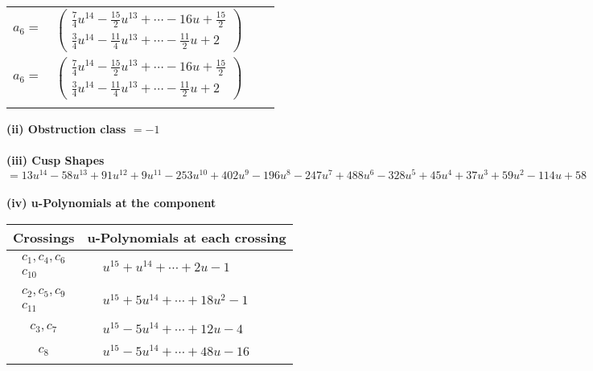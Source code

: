 \documentclass[1p]{elsarticle_modified}
\theoremstyle{definition}
\begin{document}
\begin{tabular}{m{7pt} m{180pt} m{7pt} m{180pt} }
\flushright $a_{6}=$&$\begin{pmatrix}\frac{7}{4} u^{14}-\frac{15}{2} u^{13}+\cdots-16 u+\frac{15}{2}\\\frac{3}{4} u^{14}-\frac{11}{4} u^{13}+\cdots-\frac{11}{2} u+2\end{pmatrix}$\\ \flushright $a_{6}=$&$\begin{pmatrix}\frac{7}{4} u^{14}-\frac{15}{2} u^{13}+\cdots-16 u+\frac{15}{2}\\\frac{3}{4} u^{14}-\frac{11}{4} u^{13}+\cdots-\frac{11}{2} u+2\end{pmatrix}$\\&\end{tabular}
\flushleft \textbf{(ii) Obstruction class $= -1$}\\~\\
\flushleft \textbf{(iii) Cusp Shapes $= 13 u^{14}-58 u^{13}+91 u^{12}+9 u^{11}-253 u^{10}+402 u^9-196 u^8-247 u^7+488 u^6-328 u^5+45 u^4+37 u^3+59 u^2-114 u+58$}\\~\\
\newpage\renewcommand{\arraystretch}{1}
\flushleft \textbf{(iv) u-Polynomials at the component}\newline \\
\begin{tabular}{m{50pt}|m{274pt}}
Crossings & \hspace{64pt}u-Polynomials at each crossing \\
\hline $$\begin{aligned}c_{1},c_{4},c_{6}\\c_{10}\end{aligned}$$&$\begin{aligned}
&u^{15}+u^{14}+\cdots+2 u-1
\end{aligned}$\\
\hline $$\begin{aligned}c_{2},c_{5},c_{9}\\c_{11}\end{aligned}$$&$\begin{aligned}
&u^{15}+5 u^{14}+\cdots+18 u^2-1
\end{aligned}$\\
\hline $$\begin{aligned}c_{3},c_{7}\end{aligned}$$&$\begin{aligned}
&u^{15}-5 u^{14}+\cdots+12 u-4
\end{aligned}$\\
\hline $$\begin{aligned}c_{8}\end{aligned}$$&$\begin{aligned}
&u^{15}-5 u^{14}+\cdots+48 u-16
\end{aligned}$\\
\hline
\end{tabular}\\~\\
\end{document}
